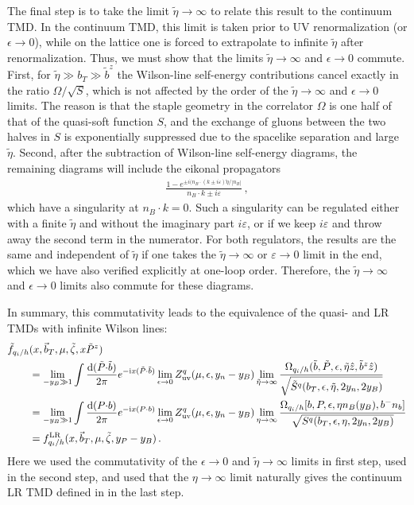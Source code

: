 \documentclass[11pt,a4paper]{article}
\newcommand{\df}{\mathrm{d}}
\newcommand{\img}{\mathrm{i}}
\newcommand{\eps}{\epsilon}
\newcommand{\nn}{\nonumber}
\newcommand{\bt}{\vec b_T}
\newcommand{\Corr}{\Omega}
\newcommand{\q}{q_i}
\newcommand{\LR}{\mathrm{LR}}
\begin{document}
The final step is to take the limit $\tilde\eta\to\infty$ to relate this
result to the continuum TMD. In the continuum TMD, this limit is taken prior
to UV renormalization (or $\eps\to0$), while on the lattice one is forced to extrapolate
to infinite $\tilde\eta$ after renormalization. Thus, we must show that the limits
$\tilde\eta\to\infty$ and $\eps\to0$ commute.
First, for $\tilde\eta \gg b_T \gg \tilde b^z $ the Wilson-line self-energy contributions cancel exactly in the ratio $\Omega/\sqrt{S}$, which is not affected by the order of the $\tilde\eta\to\infty$ and $\eps\to 0$ limits. The reason is that the staple geometry in the correlator $\Omega$ is one half of that of the quasi-soft function $S$, and the exchange of gluons between the two halves in $S$ is exponentially suppressed due to the spacelike separation and large $\tilde\eta$. Second, after the subtraction of Wilson-line self-energy diagrams, the remaining diagrams will include the eikonal propagators
\begin{align}
	\frac{1- e^{\pm i(n_B\cdot(k\pm i\varepsilon) \tilde \eta/|n_B| }}{n_B\cdot k \pm i\varepsilon}\,,
\end{align}
which have a singularity at $n_B\cdot k=0$. Such a singularity can be regulated either with a finite $\tilde\eta$ and without the imaginary part $i\varepsilon$, or if we keep $i\varepsilon$ and throw away the second term in the numerator. For both regulators, the results are the same and independent of $\tilde\eta$ if one takes the $\tilde\eta\to\infty$ or $\varepsilon\to0$ limit in the end, which we have also verified explicitly at one-loop order. Therefore, the $\tilde\eta\to\infty$ and $\eps\to0$ limits also commute for these diagrams. 

In summary, this commutativity leads to the equivalence of the quasi- and LR TMDs
with infinite Wilson lines:
\begin{align}
\tilde f_{\q/h}&(x, \bt, \mu, \tilde\zeta, x \tilde P^z)
 \nn\\&
=\lim_{-y_B \gg 1} \int\frac{\df (\tilde P{\cdot}\tilde b)}{2\pi} e^{-\img x (\tilde P{\cdot}\tilde b)}
   \lim_{\eps\to0} Z_{\rm uv}^q(\mu, \eps, y_n - y_B)
   \lim_{\tilde\eta\to\infty}   \frac{\Corr_{\q/h}(\tilde b,\tilde  P, \eps, \tilde\eta \hat z, \tilde b^z \hat z)}
        {\sqrt{\tilde S^q(b_T, \eps, \tilde\eta, 2y_n, 2y_B)}}
\nn\\&
 =\lim_{-y_B \gg 1}
 \int\frac{\df (P{\cdot}b)}{2\pi} e^{-\img x (P{\cdot}b)}
   \lim_{\eps\to0} Z_{\rm uv}^q(\mu, \eps, y_n - y_B)
   \lim_{\eta\to\infty}
   \frac{\Corr_{\q/h}[ b, P, \eps,  \eta n_B(y_B), b^- n_b ]}
        {\sqrt{ S^q(b_T, \eps, \eta, 2y_n, 2y_B)}}
\nn\\&
 = f^\LR_{\q/h}(x, \bt, \mu, \tilde \zeta, y_P - y_B)
\,.\end{align}
Here we used the commutativity of the $\eps\to0$ and $\tilde \eta \to\infty$ limits in first step, used  in the second step,
and used that the $\eta\to\infty$ limit
naturally gives the continuum LR TMD defined in  in the last step.
\end{document}
